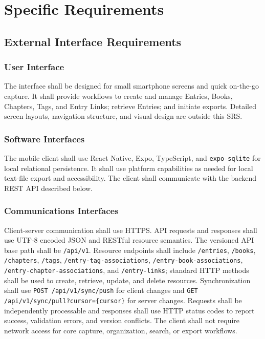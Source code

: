 \documentclass[11pt,a4paper]{article}
\begin{document}
\section{Specific Requirements}

\subsection{External Interface Requirements}
\subsubsection{User Interface}
The interface shall be designed for small smartphone screens and quick on-the-go capture. It shall provide workflows to create and manage Entries, Books, Chapters, Tags, and Entry Links; retrieve Entries; and initiate exports. Detailed screen layouts, navigation structure, and visual design are outside this SRS.

\subsubsection{Software Interfaces}
The mobile client shall use React Native, Expo, TypeScript, and \texttt{expo-sqlite} for local relational persistence. It shall use platform capabilities as needed for local text-file export and accessibility. The client shall communicate with the backend REST API described below.

\subsubsection{Communications Interfaces}
Client-server communication shall use HTTPS. API requests and responses shall use UTF-8 encoded JSON and RESTful resource semantics. The versioned API base path shall be \texttt{/api/v1}. Resource endpoints shall include \texttt{/entries}, \texttt{/books}, \texttt{/chapters}, \texttt{/tags}, \texttt{/entry-tag-associations}, \texttt{/entry-book-associations}, \texttt{/entry-chapter-associations}, and \texttt{/entry-links}; standard HTTP methods shall be used to create, retrieve, update, and delete resources. Synchronization shall use \texttt{POST /api/v1/sync/push} for client changes and \texttt{GET /api/v1/sync/pull?cursor=\{cursor\}} for server changes. Requests shall be independently processable and responses shall use HTTP status codes to report success, validation errors, and version conflicts. The client shall not require network access for core capture, organization, search, or export workflows.
\end{document}
